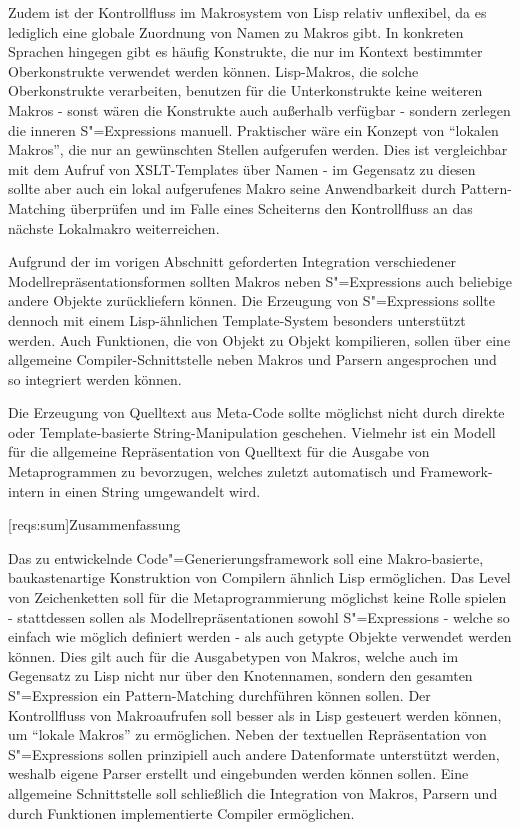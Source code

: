 \documentclass[11pt, a4paper, bibgerm]{book}
\newcommand\lsection{}
\newcommand{\sexp}{S"=Expression}
\newcommand{\sexps}{S"=Expressions}
\newcommand{\cgen}{Code"=Generierung}
\begin{document}
Zudem ist der Kontrollfluss im Makrosystem von Lisp relativ unflexibel,
da es lediglich eine globale Zuordnung von Namen zu Makros gibt. In
konkreten Sprachen hingegen gibt es häufig Konstrukte, die nur im
Kontext bestimmter Oberkonstrukte verwendet werden können. Lisp-Makros,
die solche Oberkonstrukte verarbeiten, benutzen für die Unterkonstrukte
keine weiteren Makros - sonst wären die Konstrukte auch außerhalb
verfügbar - sondern zerlegen die inneren \sexps{} manuell. Praktischer
wäre ein Konzept von "`lokalen Makros"', die nur an gewünschten Stellen
aufgerufen werden. Dies ist vergleichbar mit dem Aufruf von
XSLT-Templates über Namen - im Gegensatz zu diesen sollte aber auch ein
lokal aufgerufenes Makro seine Anwendbarkeit durch Pattern-Matching
überprüfen und im Falle eines Scheiterns den Kontrollfluss an das
nächste Lokalmakro weiterreichen.

Aufgrund der im vorigen Abschnitt geforderten Integration verschiedener
Modellrepräsentationsformen sollten Makros neben \sexps{} auch beliebige
andere Objekte zurückliefern können. Die Erzeugung von \sexps{} sollte
dennoch mit einem Lisp-ähnlichen Template-System besonders unterstützt
werden. Auch Funktionen, die von Objekt zu Objekt kompilieren, sollen
über eine allgemeine Compiler-Schnittstelle neben Makros und Parsern
angesprochen und so integriert werden können.

Die Erzeugung von Quelltext aus Meta-Code sollte möglichst nicht durch
direkte oder Template-basierte String-Manipulation geschehen. Vielmehr
ist ein Modell für die allgemeine Repräsentation von Quelltext für die
Ausgabe von Metaprogrammen zu bevorzugen, welches zuletzt automatisch
und Framework-intern in einen String umgewandelt wird.

\lsection[reqs:sum]{Zusammenfassung}

Das zu entwickelnde \cgen{}sframework soll eine Makro-basierte,
baukastenartige Konstruktion von Compilern ähnlich Lisp ermöglichen. Das
Level von Zeichenketten soll für die Metaprogrammierung möglichst keine
Rolle spielen - stattdessen sollen als Modellrepräsentationen sowohl
\sexps{} - welche so einfach wie möglich definiert werden - als auch
getypte Objekte verwendet werden können. Dies gilt auch für die
Ausgabetypen von Makros, welche auch im Gegensatz zu Lisp nicht nur über
den Knotennamen, sondern den gesamten \sexp{} ein Pattern-Matching
durchführen können sollen. Der Kontrollfluss von Makroaufrufen soll
besser als in Lisp gesteuert werden können, um "`lokale Makros"' zu
ermöglichen. Neben der textuellen Repräsentation von \sexps{} sollen
prinzipiell auch andere Datenformate unterstützt werden, weshalb eigene
Parser erstellt und eingebunden werden können sollen. Eine allgemeine
Schnittstelle soll schließlich die Integration von Makros, Parsern und
durch Funktionen implementierte Compiler ermöglichen.
\end{document}
